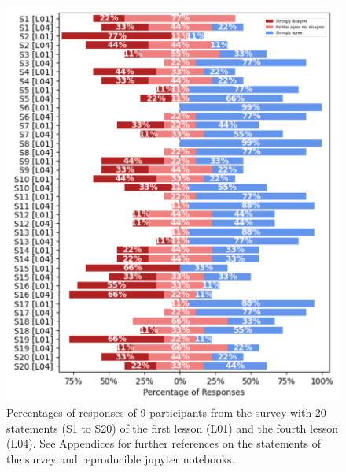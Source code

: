 \documentclass[sigconf]{acmart}
\begin{document}
\begin{figure}[t]
  \centering
    \includegraphics[width=\linewidth]{../figures/results/outputs/drawing-v03.png}  %
    \caption{
    Percentages of responses of 9 participants from the survey with 20 statements (S1 to S20) of the first lesson (L01) and the fourth lesson (L04).
    See Appendices for further references on the statements of the survey and reproducible jupyter notebooks.
    }
    \label{fig:results}
\end{figure}
\end{document}
